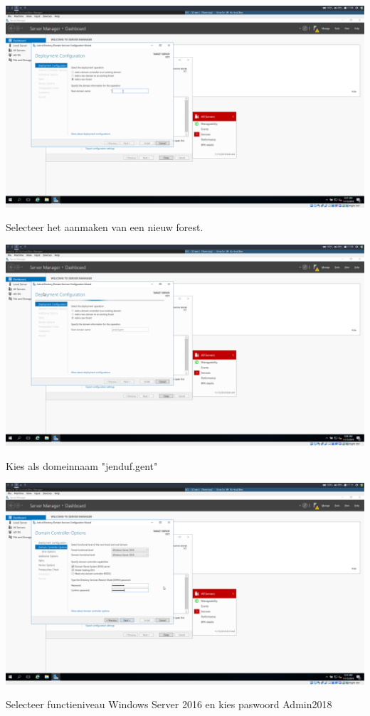 \documentclass[a4paper]{article}
\begin{document}
\begin{center}
	\includegraphics[width=15cm]{Pictures/DC1/ADDS/1542298094.png}
	
	Selecteer het aanmaken van een nieuw forest.
\end{center}
\begin{center}
	\includegraphics[width=15cm]{Pictures/DC1/ADDS/1542298140.png}
	
	Kies als domeinnaam "jenduf.gent"
\end{center}
\begin{center}
	\includegraphics[width=15cm]{Pictures/DC1/ADDS/1542298296.png}
	
	Selecteer functieniveau Windows Server 2016 en kies paswoord Admin2018
\end{center}
\end{document}
